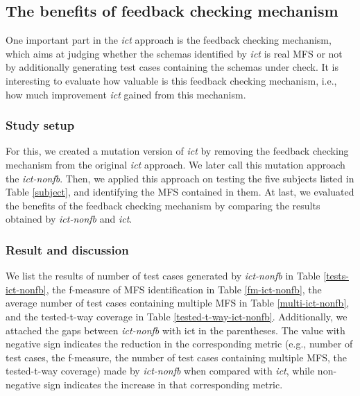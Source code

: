 \documentclass[10pt,journal,compsoc]{IEEEtran}
\begin{document}
{\color{blue}\subsection{The benefits of feedback checking mechanism}
One important part in the \emph{ict} approach is the feedback checking mechanism, which aims at judging whether the schemas identified by \emph{ict} is real MFS or not by additionally generating test cases containing the schemas under check. It is interesting to evaluate how valuable is this feedback checking mechanism, i.e., how much improvement \emph{ict} gained from this mechanism.
\subsubsection{Study setup}
For this, we created a mutation version of \emph{ict} by removing the feedback checking mechanism from the original \emph{ict} approach. We later call this mutation approach the \emph{ict-nonfb}.  Then, we applied this approach on testing the five subjects listed in Table \ref{subject}, and identifying the MFS contained in them. At last, we evaluated the benefits of the feedback checking mechanism by comparing the results obtained by \emph{ict-nonfb} and \emph{ict}.


\subsubsection{Result and discussion}
We list the results of number of test cases generated by \emph{ict-nonfb} in Table \ref{tests-ict-nonfb}, the f-measure of MFS identification in Table \ref{fm-ict-nonfb}, the average number of test cases containing multiple MFS in Table \ref{multi-ict-nonfb}, and the tested-t-way coverage in Table \ref{tested-t-way-ict-nonfb}. Additionally, we attached the gaps between \emph{ict-nonfb} with ict in the parentheses. The value with negative sign indicates the reduction in the corresponding metric (e.g., number of test cases, the f-measure, the number of test cases containing multiple MFS, the tested-t-way coverage) made by \emph{ict-nonfb} when compared with \emph{ict}, while non-negative sign indicates the increase in that corresponding metric.


}
\end{document}
